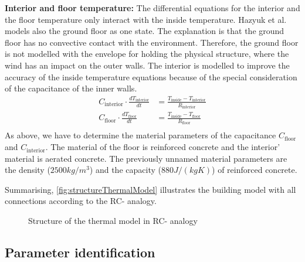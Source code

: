     \textbf{Interior and floor temperature:}\newline
    The differential equations for the interior and the floor temperature only interact with the inside temperature. 
    Hazyuk et al. \cite{Hazyuk.2012} models also the ground floor as one state. The explanation is that the ground floor has no convective contact with the environment. Therefore, the ground floor is not modelled with the envelope for holding the physical structure, where the wind has an impact on the outer walls.
    The interior is modelled to improve the accuracy of the inside temperature equations because of the special consideration of the capacitance of the inner walls.
    \begin{align}
    C_\text{interior}\cdot \frac{d T_\text{interior}}{d t} &= \frac{T_\text{inside}-T_\text{interior}}{R_\text{interior}} \\
       C_\text{floor} \cdot \frac{d T_\text{floor}}{d t} &= \frac{T_\text{inside}-T_\text{floor}}{R_\text{floor}} \nonumber\\
    \end{align}
    As above, we have to determine the material parameters of the capacitance $C_\text{floor}$ and $C_\text{interior}$. The material of the floor is reinforced concrete and the interior' material is aerated concrete. The previously unnamed material parameters are the density ($2500 kg/m^3$) \cite{AntonSchweizer.12.10.2021} and the capacity ($880 J/(kg K)$) \cite{AntonSchweizer.12.10.2021b} of reinforced concrete.\newline
     
    Summarising, \autoref{fig:structureThermalModel} illustrates the building model with all connections according to the RC- analogy.
    \begin{figure}[h]
            \centering
            \def\svgwidth{410pt}
            
            \caption{Structure of the thermal model in RC- analogy}
            \label{fig:structureThermalModel}
        \end{figure}
        
    \subsection{Parameter identification}
    \label{WorkflowModel}
    
